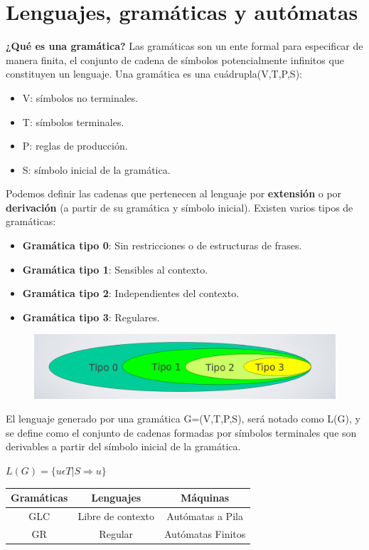 \section{Lenguajes, gramáticas y autómatas}
\textbf{¿Qué es una gramática?}\newline
Las gramáticas son un ente formal para especificar de manera finita, el conjunto de cadena de símbolos potencialmente infinitos que constituyen un lenguaje.
Una gramática es una cuádrupla(V,T,P,S):
\begin{itemize}
	\item V: símbolos no terminales.
	\item T: símbolos terminales.
	\item P: reglas de producción.
	\item S: símbolo inicial de la gramática.
\end{itemize}
Podemos definir las cadenas que pertenecen al lenguaje por \textbf{extensión} o por \textbf{derivación} (a partir de su gramática y símbolo inicial). Existen varios tipos de gramáticas:
\begin{itemize}
	\item \textbf{Gramática tipo 0}: Sin restricciones o de estructuras de frases.
	\item \textbf{Gramática tipo 1}: Sensibles al contexto.
	\item \textbf{Gramática tipo 2}: Independientes del contexto.
	\item \textbf{Gramática tipo 3}: Regulares.
\end{itemize}
\begin{figure}[h]
	\centering
	\includegraphics[width=0.5\linewidth]{img/2}
	\caption{}
	\label{fig:2}
\end{figure}

El lenguaje generado por una gramática G=(V,T,P,S), será notado como L(G), y se define como el conjunto de cadenas formadas por símbolos terminales que son derivables a partir del símbolo inicial de la gramática.

\begin{center}
	$L(G)=\{u\epsilon T | S \Rightarrow u\}$
\end{center}

\begin{center}
	\begin{tabular}{|c|c|c|}
		\hline 
		Gramáticas	& Lenguajes  & Máquinas \\ 
		\hline 
		GLC & Libre de contexto & Autómatas a Pila \\ 
		\hline 
		GR & Regular & Autómatas Finitos\\ 
		\hline 
	\end{tabular} 
\end{center}

